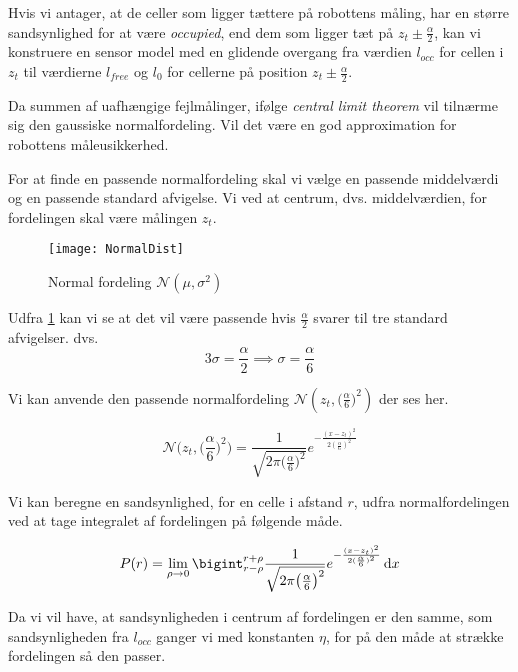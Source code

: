 Hvis vi antager, at de celler som ligger tættere på robottens måling, har en større sandsynlighed for at være \emph{occupied}, end dem som ligger tæt på $z_t \pm \frac{\alpha}{2}$, kan vi konstruere en sensor model med en glidende overgang fra værdien $l_{occ}$ for cellen i $z_t$ til værdierne $l_{free}$ og $l_0$ for cellerne på position $z_t \pm \frac{\alpha}{2}$. 

Da summen af uafhængige fejlmålinger, ifølge \emph{central limit theorem} vil tilnærme sig
den gaussiske normalfordeling. \cite[p. 223]{ArtificialIntelligence}
Vil det være en god approximation for robottens måleusikkerhed.

For at finde en passende normalfordeling skal vi vælge en passende middelværdi og en passende standard afvigelse. 
Vi ved at centrum, dvs. middelværdien, for fordelingen skal være målingen $z_t$.

\begin{figure}
\centering \texttt{[image: NormalDist]}
\label{normaldistimg}
\caption{Normal fordeling $\mathcal{N}(\mu,\sigma^2)$}
\end{figure}

Udfra \cref{normaldistimg} kan vi se at det vil være passende hvis $\frac{\alpha}{2}$ svarer til tre standard afvigelser. dvs.
\begin{equation}
	3\sigma = \frac{\alpha}{2} \implies \sigma = \frac{\alpha}{6}
\end{equation}

Vi kan anvende den passende normalfordeling $\mathcal{N}(z_t,\big(\frac{\alpha}{6}\big)^2)$ der ses her. 

\begin{equation}
\mathcal{N}\bigg(z_t,\bigg(\frac{\alpha}{6}\bigg)^2\bigg) = 
\frac{1}{\sqrt{2 \pi \big(\frac{\alpha}{6}\big)^2}}e^{- \frac{(x - z_t)^2}{2 (\frac{\alpha}{6})^2}}
\end{equation}

Vi kan beregne en sandsynlighed, for en celle i afstand $r$, udfra normalfordelingen ved at tage integralet af fordelingen på følgende måde.

\begin{equation}
P(r) = \lim \limits_{\rho \to 0} \bigint_{r-\rho}^{r+\rho} \frac{1}{\sqrt{2 \pi \big(\frac{\alpha}{6}\big)^2}}e^{- \frac{(x - z_t)^2}{2 (\frac{\alpha}{6})^2}}\, \mathrm{d}x
\end{equation}

Da vi vil have, at sandsynligheden i centrum af fordelingen er den samme, som sandsynligheden fra $l_{occ}$ ganger vi med konstanten $\eta$, for på den måde at strække fordelingen så den passer. 

